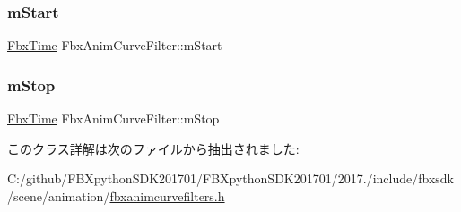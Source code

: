 \subsubsection{\texorpdfstring{m\+Start}{mStart}}
{\footnotesize\ttfamily \hyperlink{class_fbx_time}{Fbx\+Time} Fbx\+Anim\+Curve\+Filter\+::m\+Start\hspace{0.3cm}{\ttfamily [protected]}}

\mbox{\label{class_fbx_anim_curve_filter_ad3be4640799f960d1910a2e3132e82eb}} 
\subsubsection{\texorpdfstring{m\+Stop}{mStop}}
{\footnotesize\ttfamily \hyperlink{class_fbx_time}{Fbx\+Time} Fbx\+Anim\+Curve\+Filter\+::m\+Stop\hspace{0.3cm}{\ttfamily [protected]}}



このクラス詳解は次のファイルから抽出されました\+:\begin{DoxyCompactItemize}
\item 
C\+:/github/\+F\+B\+Xpython\+S\+D\+K201701/\+F\+B\+Xpython\+S\+D\+K201701/2017./include/fbxsdk/scene/animation/\hyperlink{fbxanimcurvefilters_8h}{fbxanimcurvefilters.\+h}\end{DoxyCompactItemize}
